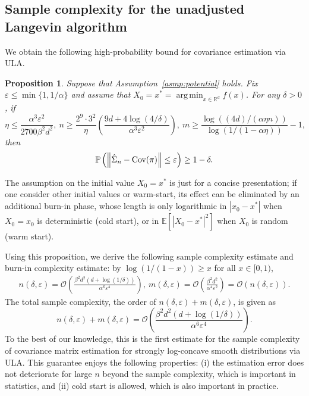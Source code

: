 \documentclass[12pt,reqno]{amsart}
\newtheorem{proposition}[theorem]{Proposition}
\theoremstyle{remark}
\theoremstyle{definition}
\newcommand{\calO}{\mathcal{O}}
\newcommand{\R}{\mathbb{R}}
\renewcommand{\Pr}{\mathbb{P}}
\newcommand{\Cov}{\textnormal{Cov}}
\renewcommand{\epsilon}{\varepsilon}
\DeclareMathOperator*{\argmin}{arg\,min}
\begin{document}
\subsection{Sample complexity for the unadjusted Langevin algorithm}
We obtain the following high-probability bound for covariance estimation via ULA.
\begin{proposition}\label{prop:comp:ula}
    Suppose that Assumption~\ref{asmp:potential} holds. Fix $\epsilon\le \min\{1,1/\alpha\}$ and assume that $X_{0}=x^{\ast}=\argmin_{x\in\R^{d}}f(x)$.
    For any $\delta>0$, if 
    \begin{equation*}
        \eta\le \frac{\alpha^{3}\epsilon^{2}}{2700\beta^{2}d^{2}},\ n\ge \frac{2^{9}\cdot 3^{2}}{\eta}\left(\frac{9d+4\log(4/\delta)}{\alpha^{3}\epsilon^{2}}\right),\ 
        m\ge \frac{\log((4d)/(\alpha\eta n))}{\log(1/(1-\alpha\eta))}-1,\ 
    \end{equation*}
    then
    \begin{equation*}
        \Pr\left(\left\|\hat{\Sigma}_{n}-\Cov(\pi)\right\|\le \epsilon\right)\ge 1-\delta.
    \end{equation*}
\end{proposition}
The assumption on the initial value $X_{0}=x^{\ast}$ is just for a concise presentation; if one consider other initial values or warm-start, its effect can be eliminated by an additional burn-in phase, whose length is only logarithmic in $|x_0 - x^\ast|$ when $X_0 = x_0$ is deterministic (cold start), or in $\mathbb{E}[|X_0 - x^\ast|^2]$ when $X_0$ is random (warm start).

Using this proposition, we derive the following sample complexity estimate and burn-in complexity estimate: by $\log(1/(1-x))\ge x$ for all $x\in[0,1)$, 
\begin{align*}
    n(\delta,\epsilon)=\calO\left(\frac{\beta^{2}d^{2}(d+\log(1/\delta))}{\alpha^{6}\epsilon^{4}}\right),\ 
    m(\delta,\epsilon)=\calO\left(\frac{\beta^{2}d^{2}}{\alpha^{4}\epsilon^{2}}\right)=\calO(n(\delta,\epsilon)).
\end{align*}
The total sample complexity, the order of $n(\delta,\epsilon)+m(\delta,\epsilon)$, is given as
\begin{equation}\label{eq:comp:ula}
    n(\delta,\epsilon)+m(\delta,\epsilon)=\calO\left(\frac{\beta^{2}d^{2}(d+\log(1/\delta))}{\alpha^{6}\epsilon^{4}}\right).
\end{equation}
To the best of our knowledge, this is the first estimate for the sample complexity of covariance matrix estimation for strongly log-concave smooth distributions via ULA.
This guarantee enjoys the following properties: (i) the estimation error does not deteriorate for large $n$ beyond the sample complexity, which is important in statistics, and (ii) cold start is allowed, which is also important in practice.
\end{document}
